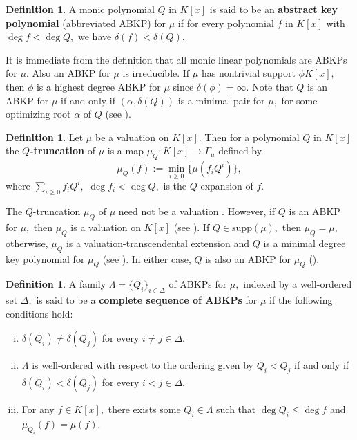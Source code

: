 \documentclass[11pt]{amsart}
\theoremstyle{definition}
\newtheorem{definition}[theorem]{Definition}
\theoremstyle{remark}
\numberwithin{equation}{section}
\begin{document}
 			\begin{definition}
 				A monic polynomial $Q$ in $K[x]$ is said to be an {\bf abstract key polynomial}  (abbreviated  ABKP) for $\mu$ if for every polynomial $f$ in $K[x]$  with $\deg f< \deg Q,$ we have $\delta(f)<\delta(Q).$
 			\end{definition}
 			It is immediate from the definition that all monic linear polynomials are ABKPs for $\mu.$  Also an ABKP for $\mu$ is irreducible. If $\mu$ has nontrivial support $\phi K[x],$ then $\phi$ is a highest degree ABKP for $\mu$ since $\delta(\phi)=\infty.$
 			Note that $Q$ is an ABKP for $\mu$ if and only if $(\alpha,\delta(Q))$ is a minimal pair for $\mu,$ for some optimizing root $\alpha$ of $Q$ (see \cite[Theorem 1.1]{JN}).
 			\begin{definition}
 				Let $\mu$ be a valuation on $K[x].$ Then
 				for a polynomial $Q$ in $K[x]$ the {\bf $Q$-truncation} of $\mu$ is a map $\mu_Q:K[x]\longrightarrow \Gamma_\mu$ defined by 
 				$$ \mu_Q(f):= \min_{i\geq 0}\{\mu(f_iQ^i)\},$$
 				where $\sum_{i\geq 0} f_i Q^i,$ $\deg f_i <\deg Q,$  is the $Q $-expansion of $f.$ 
 			\end{definition}
 			The $Q$-truncation  $\mu_Q$  of $\mu$ need not be a valuation \cite[Example 2.5]{NS}. However,  if $Q$ is an ABKP for $\mu,$ then $\mu_Q$ is a valuation on $K[x]$ (see \cite[Proposition 2.6]{NS}). If $Q\in \text{supp}(\mu),$ then $\mu_Q=\mu,$ otherwise, $\mu_Q$ is a valuation-transcendental extension and $Q$ is a minimal degree key polynomial for $\mu_Q$ (see \cite[Theorem 2.21]{Ma}). In either case, $Q$ is also an ABKP for $\mu_Q$ (\cite[Corollary 2.22]{Ma}).
 			\begin{definition}
 				A family $\Lambda=\{Q_i\}_{i\in\Delta}$ of ABKPs for $\mu,$ indexed by a well-ordered set $\Delta,$ is said to be a {\bf complete sequence of ABKPs} for $\mu$ if the following conditions hold:
 				\begin{enumerate}[(i)]
 					\item $\delta(Q_i)\neq \delta(Q_j)$ for every $i\neq j\in\Delta.$
 					\item $\Lambda$ is well-ordered with respect to the ordering given by $Q_i< Q_j$ if and only if  $\delta(Q_i)<\delta(Q_j)$ for every $i<j\in \Delta.$ 
 					\item For any $f\in K[x],$ there exists some $Q_i \in \Lambda$ such that $\deg Q_i\leq \deg f$ and  $\mu_{Q_i}(f)=\mu(f).$
 				\end{enumerate}
 			\end{definition}
 			
\end{document}
